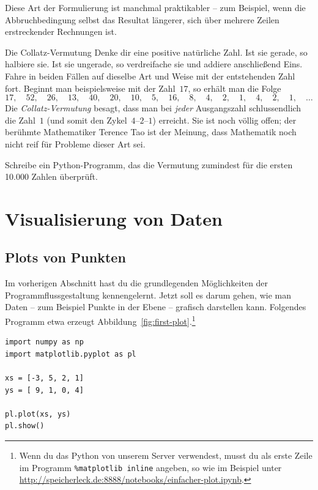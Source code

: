 \documentclass{blatt}
\begin{document}
Diese Art der Formulierung ist manchmal praktikabler -- zum Beispiel, wenn die
Abbruchbedingung selbst das Resultat längerer, sich über mehrere Zeilen
erstreckender Rechnungen ist.

\begin{aufgabe}{Die Collatz-Vermutung}
Denke dir eine positive natürliche Zahl. Ist sie gerade, so halbiere sie. Ist
sie ungerade, so verdreifache sie und addiere anschließend Eins. Fahre in
beiden Fällen auf dieselbe Art und Weise mit der entstehenden Zahl fort.
Beginnt man beispielsweise mit der Zahl~$17$, so erhält man die Folge
\[ 17,\quad52,\quad26,\quad13,\quad40,\quad20,\quad10,\quad5,\quad16,\quad8,\quad4,\quad2,\quad1,\quad4,\quad2,\quad1,\quad\ldots \]
Die \emph{Collatz-Vermutung} besagt, dass man bei \emph{jeder} Ausgangszahl
schlussendlich die Zahl~$1$ (und somit den Zykel~$4$--$2$--$1$) erreicht. Sie
ist noch völlig offen; der berühmte Mathematiker Terence Tao ist der Meinung,
dass Mathematik noch nicht reif für Probleme dieser Art sei.

Schreibe ein Python-Programm, das die Vermutung zumindest für die ersten
10.000 Zahlen überprüft.
\end{aufgabe}


\section{Visualisierung von Daten}

\subsection{Plots von Punkten}

Im vorherigen Abschnitt hast du die grundlegenden Möglichkeiten der
Programmflussgestaltung kennengelernt. Jetzt soll es darum gehen, wie man Daten
-- zum Beispiel Punkte in der Ebene -- grafisch darstellen kann. Folgendes
Programm etwa erzeugt Abbildung~\ref{fig:first-plot}.\footnote{Wenn du das
Python von unserem Server verwendest, musst du als erste Zeile im Programm
\texttt{\%matplotlib inline} angeben, so wie im Beispiel unter
\url{http://speicherleck.de:8888/notebooks/einfacher-plot.ipynb}.}

\begin{verbatim}
import numpy as np
import matplotlib.pyplot as pl

xs = [-3, 5, 2, 1]
ys = [ 9, 1, 0, 4]

pl.plot(xs, ys)
pl.show()
  \end{verbatim}
\end{document}
